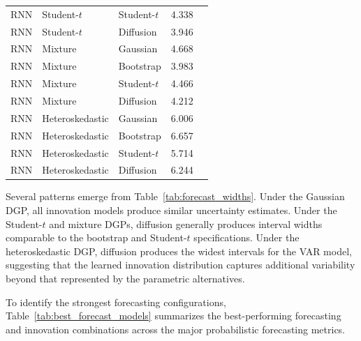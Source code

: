 \documentclass[11pt]{article}
\begin{document}
\begin{table}[H]
\begin{tabular}{llllr}
RNN & Student-$t$ & Student-$t$ & 4.338 \\
RNN & Student-$t$ & Diffusion & 3.946 \\
\midrule
RNN & Mixture & Gaussian & 4.668 \\
RNN & Mixture & Bootstrap & 3.983 \\
RNN & Mixture & Student-$t$ & 4.466 \\
RNN & Mixture & Diffusion & 4.212 \\
\midrule
RNN & Heteroskedastic & Gaussian & 6.006 \\
RNN & Heteroskedastic & Bootstrap & 6.657 \\
RNN & Heteroskedastic & Student-$t$ & 5.714 \\
RNN & Heteroskedastic & Diffusion & 6.244 \\
\bottomrule
\end{tabular}
\end{table}

Several patterns emerge from Table~\ref{tab:forecast_widths}. Under the Gaussian DGP, all innovation models produce similar uncertainty estimates. Under the Student-$t$ and mixture DGPs, diffusion generally produces interval widths comparable to the bootstrap and Student-$t$ specifications. Under the heteroskedastic DGP, diffusion produces the widest intervals for the VAR model, suggesting that the learned innovation distribution captures additional variability beyond that represented by the parametric alternatives.

To identify the strongest forecasting configurations, Table~\ref{tab:best_forecast_models} summarizes the best-performing forecasting and innovation combinations across the major probabilistic forecasting metrics.
\end{document}
